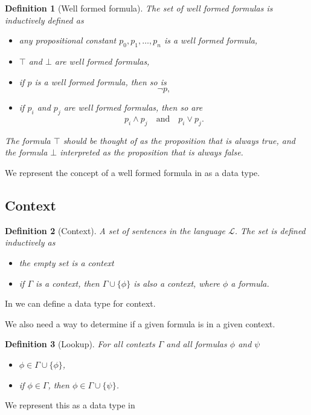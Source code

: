 \documentclass[titlepage]{article}
\newtheorem{definition}{Definition}[section]
\begin{document}
\begin{definition}[Well formed formula]
    The set of well formed formulas is inductively defined as
    \begin{itemize}
        \item any propositional constant $p_0,p_1,\hdots,p_n$ is a well formed formula,
        \item $\top$ and $\bot$ are well formed formulas,
        \item if $p$ is a well formed formula, then so is
        $$\neg p,$$
        \item if $p_i$ and $p_j$ are well formed formulas, then so are
            $$p_i \wedge p_j \quad \text{and} \quad p_i \vee p_j.$$
    \end{itemize}
    The formula $\top$ should be thought of as the proposition that is always true, and the formula $\bot$ interpreted as the proposition that is always false.
\end{definition}

We represent the concept of a well formed formula in \Agda as a data type.




\subsection{Context}

\begin{definition}[Context]
    A set of sentences in the language $\mathcal{L}$. The set is defined inductively as
    \begin{itemize}
        \item the empty set is a context
        \item if $\Gamma$ is a context, then $\Gamma \cup \{\phi\}$ is also a context, where $\phi$ a formula.
    \end{itemize}
\end{definition}

In \Agda we can define a data type for context.

We also need a way to determine if a given formula is in a given context. 
\begin{definition}[Lookup]
    For all contexts $\Gamma$ and all formulas $\phi$ and $\psi$
    \begin{itemize}
        \item $\phi \in \Gamma \cup \{\phi\}$,
        \item if $\phi \in \Gamma$, then $\phi \in \Gamma \cup \{\psi\}$.
    \end{itemize}
\end{definition}
We represent this as a data type in \Agda
\end{document}
